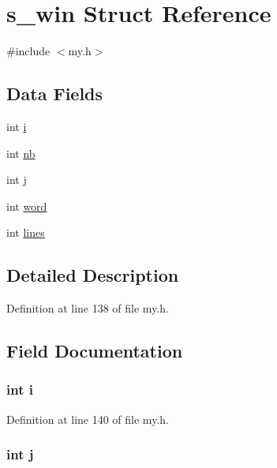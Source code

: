 \hypertarget{structs__win}{\section{s\+\_\+win Struct Reference}
\label{structs__win}
}


{\ttfamily \#include $<$my.\+h$>$}

\subsection*{Data Fields}
\begin{DoxyCompactItemize}
\item 
int \hyperlink{structs__win_acb559820d9ca11295b4500f179ef6392}{i}
\item 
int \hyperlink{structs__win_ab310c6afcc676eab3930dce2650511c0}{nb}
\item 
int \hyperlink{structs__win_a37d972ae0b47b9099e30983131d31916}{j}
\item 
int \hyperlink{structs__win_a32e8aeb1c57991c216eeb16a1599d816}{word}
\item 
int \hyperlink{structs__win_a9921ae02cadccc99dd6c3a9b68be050a}{lines}
\end{DoxyCompactItemize}


\subsection{Detailed Description}


Definition at line 138 of file my.\+h.



\subsection{Field Documentation}
\hypertarget{structs__win_acb559820d9ca11295b4500f179ef6392}{
\subsubsection[{i}]{\setlength{\rightskip}{0pt plus 5cm}int i}}\label{structs__win_acb559820d9ca11295b4500f179ef6392}


Definition at line 140 of file my.\+h.

\hypertarget{structs__win_a37d972ae0b47b9099e30983131d31916}{
\subsubsection[{j}]{\setlength{\rightskip}{0pt plus 5cm}int j}}\label{structs__win_a37d972ae0b47b9099e30983131d31916}


